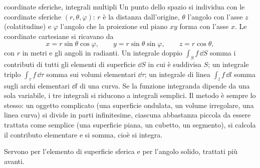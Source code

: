 \documentclass[main.tex]{subfiles}
\begin{document}
\renewcommand{\richiamoprefix}{Richiamo di Matematica --- }
\begin{riquadro}{coordinate sferiche, integrali multipli}
Un punto dello spazio si individua con le coordinate sferiche $(r,\theta,\varphi)$: $r$ è la distanza dall'origine, $\theta$ l'angolo con l'asse $z$ (colatitudine) e $\varphi$ l'angolo che la proiezione sul piano $xy$ forma con l'asse $x$. Le coordinate cartesiane si ricavano da
\[
x=r\sin\theta\cos\varphi,\qquad y=r\sin\theta\sin\varphi,\qquad z=r\cos\theta ,
\]
con $r$ in metri e gli angoli in radianti. Un integrale doppio $\int_S f\,\dd S$ somma i contributi di tutti gli elementi di superficie $\dd S$ in cui è suddivisa $S$; un integrale triplo $\int_\tau f\,\dd\tau$ somma sui volumi elementari $\dd\tau$; un integrale di linea $\int_l f\,\dd l$ somma sugli archi elementari $\dd l$ di una curva. Se la funzione integranda dipende da una sola variabile, i tre integrali si riducono a integrali semplici. Il metodo è sempre lo stesso: un oggetto complicato (una superficie ondulata, un volume irregolare, una linea curva) si divide in parti infinitesime, ciascuna abbastanza piccola da essere trattata come semplice (una superficie piana, un cubetto, un segmento), si calcola il contributo elementare e si somma, cioè si integra.

Servono per l'elemento di superficie sferica e per l'angolo solido, trattati più avanti.
\end{riquadro}
\end{document}
